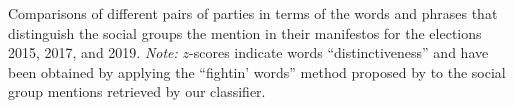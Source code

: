 Comparisons of different pairs of parties in terms of the words and phrases that distinguish the social groups the mention in their manifestos for the elections 2015, 2017, and 2019. \emph{Note:} $z$-scores indicate words ``distinctiveness'' and have been obtained by applying the ``fightin' words'' method proposed by \citet{monroe_fightin_2008} to the social group mentions retrieved by our classifier. \label{fig:uk_manifestos_sg_fighting_words}
